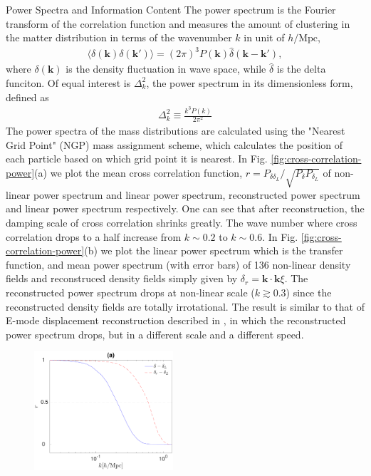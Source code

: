 \begin{section}{Power Spectra and Information Content}
  \label{sec:fisherinfo}
    The power spectrum is the Fourier transform of the correlation function and measures
 the amount of clustering in the matter distribution in terms of the wavenumber
 $k$ in unit of $h/\mathrm{Mpc}$,
\begin{align}
    \langle \delta \left( \bm{k} \right) \delta \left( \bm{k'}\right) \rangle =
\left( 2\pi \right) ^3 P \left( \bm{k} \right) \hat{\delta} \left( \bm{k}-\bm{k'} \right),
\end{align}
where $\delta \left( \bm{k} \right)$ is the density fluctuation in wave space, while 
$\hat{\delta}$ is the delta funciton. Of equal interest is $\Delta ^2_k$, the power 
spectrum in its dimensionless form, defined as
\begin{align}
    \Delta ^2_k \equiv \frac{k^3 P \left( k \right)}{2\pi ^2}
\end{align}
    The power spectra of the mass distributions are calculated using the "Nearest Grid Point" 
(NGP) mass assignment scheme, which calculates the position of each particle based on which 
grid point it is nearest. In Fig. \ref{fig:cross-correlation-power}(a) we plot the mean cross correlation 
function, $r=P_{\delta \delta_L}/\sqrt{P_\delta P_{\delta_L}}$ of non-linear power spectrum and 
linear power spectrum, reconstructed power spectrum and 
linear power spectrum respectively. One can see that after reconstruction, the damping scale of cross correlation
shrinks greatly. The wave number where cross correlation drops to a half increase from $k\sim 0.2$ to $k \sim 0.6$.
 In Fig. \ref{fig:cross-correlation-power}(b) we plot the linear power spectrum which is the transfer function, and mean 
power spectrum (with error bars) of 136 non-linear density fields and reconstruced density fields simply 
given by $\delta_r=\bm{k}\cdot\bm{k}\xi$. The reconstructed power spectrum drops at non-linear scale ($k \gtrsim 0.3$) 
since the reconstructed density fields are totally irrotational. The result is similar to that of 
E-mode displacement reconstruction described in \cite{bib:Yu2016}, in which the reconstructed power spectrum 
drops, but in a different scale and a different speed.
\begin{figure}
\centering
\includegraphics[width=0.46\textwidth]{cross_correlaion_analysis-crop.pdf} 

\end{figure}
\end{section}

